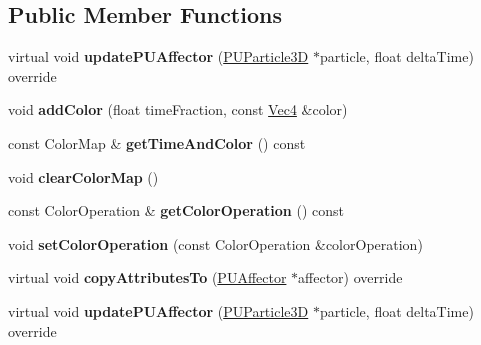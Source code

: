 \subsection*{Public Member Functions}
\begin{DoxyCompactItemize}
\item 
\mbox{\label{classPUColorAffector_a92c040e00df5bb07744eeaa81521f21f}} 
virtual void {\bfseries update\+P\+U\+Affector} (\hyperlink{structPUParticle3D}{P\+U\+Particle3D} $\ast$particle, float delta\+Time) override
\item 
\mbox{\label{classPUColorAffector_ad5e64cf47543f024c13371d20da10cb1}} 
void {\bfseries add\+Color} (float time\+Fraction, const \hyperlink{classVec4}{Vec4} \&color)
\item 
\mbox{\label{classPUColorAffector_a6757a12f4f139b7e17fcb2295de2586c}} 
const Color\+Map \& {\bfseries get\+Time\+And\+Color} () const
\item 
\mbox{\label{classPUColorAffector_a0bd88d77ad37b586158a1c3a4a4ba652}} 
void {\bfseries clear\+Color\+Map} ()
\item 
\mbox{\label{classPUColorAffector_ab0a145e002205191fceaf9fc71823477}} 
const Color\+Operation \& {\bfseries get\+Color\+Operation} () const
\item 
\mbox{\label{classPUColorAffector_aadaa119df7e501c214aedf8e45d26526}} 
void {\bfseries set\+Color\+Operation} (const Color\+Operation \&color\+Operation)
\item 
\mbox{\label{classPUColorAffector_af059b572ac43a0c5da6985f4d4ca5b8c}} 
virtual void {\bfseries copy\+Attributes\+To} (\hyperlink{classPUAffector}{P\+U\+Affector} $\ast$affector) override
\item 
\mbox{\label{classPUColorAffector_a4a680a6b617160e9c5538fa7f57a68e1}} 
virtual void {\bfseries update\+P\+U\+Affector} (\hyperlink{structPUParticle3D}{P\+U\+Particle3D} $\ast$particle, float delta\+Time) override
\item 
\mbox{\label{classPUColorAffector_ad5e64cf47543f024c13371d20da10cb1}} 

\end{DoxyCompactItemize}
